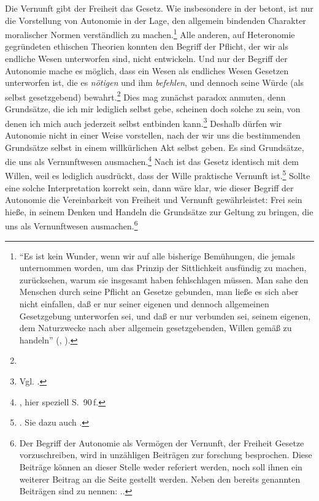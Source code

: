 \begin{nummerierung}
\item\label{AutonomiederVernunft} Die Vernunft gibt der
Freiheit das Gesetz. Wie  insbesondere in der
 betont, ist nur die Vorstellung von Autonomie in der Lage, den
allgemein bindenden Charakter moralischer Normen verständlich zu
machen.\footnote{\enquote{Es ist kein Wunder, wenn wir auf alle bisherige
Bemühungen, die jemals unternommen worden, um das Prinzip der Sittlichkeit
ausfündig zu machen, zurücksehen, warum sie insgesamt haben fehlschlagen müssen.
Man sahe den Menschen durch seine Pflicht an Gesetze gebunden, man ließe es sich
aber nicht einfallen, daß er nur seiner eigenen und dennoch allgemeinen
Gesetzgebung unterworfen sei, und daß er nur verbunden sei, seinem eigenen, dem
Naturzwecke nach aber allgemein gesetzgebenden, Willen gemäß zu handeln}
\mkbibparens{\cite[][BA 73]{Kant:GrundlegungzurMetaphysikderSitten1965},
\cite{Kant:GesammelteWerke1900ff.}}.}  Alle anderen, auf Heteronomie gegründeten
ethischen Theorien konnten den Begriff der Pflicht, der wir als endliche Wesen
unterworfen sind, nicht entwickeln. Und nur der Begriff der Autonomie mache es
möglich, dass ein Wesen als endliches Wesen Gesetzen unterworfen ist, die es
\emph{nötigen} und ihm \emph{befehlen}, und dennoch seine Würde (als
selbst gesetzgebend) bewahrt.\footnote{} Dies mag zunächst paradox anmuten,
denn Grundsätze, die ich mir lediglich selbst gebe, scheinen doch solche zu
sein, von denen ich mich auch jederzeit selbst entbinden kann.\footnote{Vgl.
\cite[][226]{Pinkard:GermanPhilosophy1760-18602002}.} Deshalb dürfen wir
Autonomie nicht in einer Weise vorstellen, nach der wir uns die
bestimmenden Grundsätze selbst in einem willkürlichen Akt selbst geben. Es sind
Grundsätze, die uns als Vernunftwesen
ausmachen.\footnote{\cite[Vgl.][90-130]{Korsgaard:TheSourcesofNormativity1996},
hier speziell S.~90\,f. } Nach  ist das Gesetz identisch mit dem
Willen, weil es lediglich ausdrückt, dass der Wille praktische Vernunft
ist.\footnote{\cite[Vgl.][]{Roedl:Selbstgesetzgebung2011}. Sie dazu auch
\cite[][]{Menke:AutonomieundBefreiung2010}.} Sollte eine solche Interpretation
korrekt sein, dann wäre klar, wie dieser Begriff der Autonomie die Vereinbarkeit
von Freiheit und Vernunft gewährleistet: Frei sein hieße, in seinem Denken und
Handeln die Grundsätze zur Geltung zu bringen, die uns als Vernunftwesen
ausmachen.\footnote{Der Begriff der Autonomie als Vermögen der Vernunft, der Freiheit Gesetze
vorzuschreiben, wird in unzähligen Beiträgen zur forschung
besprochen. Diese Beiträge können an dieser Stelle weder referiert werden, noch
soll ihnen ein weiterer Beitrag an die Seite gestellt werden. Neben den bereits
genannten Beiträgen sind zu nennen:
\cite{Sturma:KantsEthikderAutonomie2004,Gunkel:SpontaneitaetundmoralischeAutonomie1989,
Shell:KantandtheLimitsofAutonomy2009,Shell:KantandtheenquoteParadoxofAutonomy2012}..}


\end{nummerierung}
